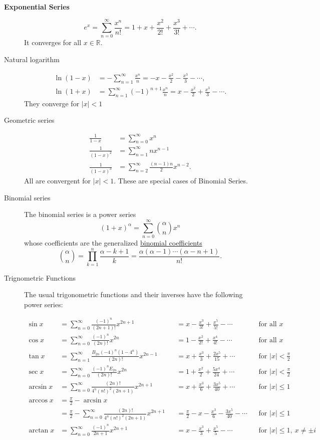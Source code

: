 \documentclass{notes}
\begin{document}
\begin{description}
\item [\textbf{Exponential Series}]
$$e^{x} = \sum^{\infty}_{n=0} \frac{x^n}{n!} = 1 + x + \frac{x^2}{2!} + \frac{x^3}{3!} + \cdots.$$
It converges for all $x \in \mathbb{R}$.
\item[Natural logarithm] 
\[\begin{aligned}
\ln(1-x) &= - \sum^{\infty}_{n=1} \frac{x^n}n = -x - \frac{x^2}2 - \frac{x^3}3 - \cdots , \\
\ln(1+x) &= \sum^\infty_{n=1} (-1)^{n+1}\frac{x^n}n = x - \frac{x^2}2 + \frac{x^3}3 - \cdots .
\end{aligned}\]
They converge for $|x| < 1$
\item[Geometric series]
\[\begin{aligned}
\frac{1}{1-x} &= \sum^\infty_{n=0} x^n \\
\frac{1}{(1-x)^2} &= \sum^\infty_{n=1} nx^{n-1}\\
\frac{1}{(1-x)^3} &= \sum^\infty_{n=2} \frac{(n-1)n}{2} x^{n-2}.
\end{aligned}\] All are convergent for \(|x| < 1\). These are special cases of Binomial Series.

\item[Binomial series] The binomial series is a power series
\[(1+x)^\alpha = \sum_{n=0}^\infty \binom{\alpha}{n} x^n\]
whose coefficients are the generalized
\href{https://en.wikipedia.org/wiki/Binomial_coefficient}{binomial coefficients}
\[\binom{\alpha}{n} = \prod_{k=1}^n \frac{\alpha-k+1}k = \frac{\alpha(\alpha-1)\cdots(\alpha-n+1)}{n!}.\]
\item[Trignometric Functions]
The usual trigonometric functions and
their inverses have the following power series:

\[\begin{aligned}
\sin x &= \sum^{\infty}_{n=0} \frac{(-1)^n}{(2n+1)!} x^{2n+1} &&= x - \frac{x^3}{3!} + \frac{x^5}{5!} - \cdots && \text{for all } x\\[6pt]
\cos x &= \sum^{\infty}_{n=0} \frac{(-1)^n}{(2n)!} x^{2n} &&= 1 - \frac{x^2}{2!} + \frac{x^4}{4!} - \cdots && \text{for all } x\\[6pt]
\tan x &= \sum^{\infty}_{n=1} \frac{B_{2n} (-4)^n \left(1-4^n\right)}{(2n)!} x^{2n-1} &&= x + \frac{x^3}{3} + \frac{2 x^5}{15} + \cdots && \text{for }|x| < \frac{\pi}{2}\\[6pt]
\sec x &= \sum^{\infty}_{n=0} \frac{(-1)^n E_{2n}}{(2n)!} x^{2n} &&=1+\frac{x^2}{2}+\frac{5x^4}{24}+\cdots && \text{for }|x| < \frac{\pi}{2}\\[6pt]
\arcsin x &= \sum^{\infty}_{n=0} \frac{(2n)!}{4^n (n!)^2 (2n+1)} x^{2n+1} &&=x+\frac{x^3}{6}+\frac{3x^5}{40}+\cdots && \text{for }|x| \le 1\\[6pt]
\arccos x &=\frac{\pi}{2}-\arcsin x\\&=\frac{\pi}{2}- \sum^{\infty}_{n=0} \frac{(2n)!}{4^n (n!)^2 (2n+1)} x^{2n+1}&&=\frac{\pi}{2}-x-\frac{x^3}{6}-\frac{3x^5}{40}-\cdots&& \text{for }|x| \le 1\\[6pt]
\arctan x &= \sum^{\infty}_{n=0} \frac{(-1)^n}{2n+1} x^{2n+1} &&=x-\frac{x^3}{3} + \frac{x^5}{5}-\cdots && \text{for }|x| \le 1,\ x\neq\pm i
\end{aligned}\]


\end{description}
\end{document}
